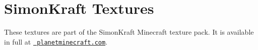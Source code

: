 \chapter{Simon\+Kraft Textures}
\hypertarget{md_textures_2simonkraft_2README}{}\label{md_textures_2simonkraft_2README}
\label{md_textures_2simonkraft_2README_autotoc_md0}%
%
 These textures are part of the Simon\+Kraft Minecraft texture pack. It is available in full at \href{https://www.planetminecraft.com/texture-pack/simonkraft/}{\texttt{ planetminecraft.\+com}}. 